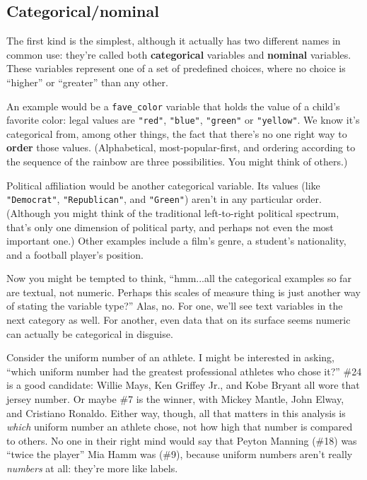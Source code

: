\subsection{Categorical/nominal}

The first kind is the simplest, although it actually has two different names in
common use: they're called both \textbf{categorical} variables and
\textbf{nominal} variables. These variables represent one of a set of
predefined choices, where no choice is ``higher'' or ``greater'' than any
other.

An example would be a \texttt{fave\_color} variable that holds the value of a
child's favorite color: legal values are \texttt{"red"}, \texttt{"blue"},
\texttt{"green"} or \texttt{"yellow"}. We know it's categorical from, among
other things, the fact that there's no one right way to \textbf{order} those
values. (Alphabetical, most-popular-first, and ordering according to the
sequence of the rainbow are three possibilities. You might think of others.)

Political affiliation would be another categorical variable. Its values (like
\texttt{"Democrat"}, \texttt{"Republican"}, and \texttt{"Green"}) aren't in any
particular order. (Although you might think of the traditional left-to-right
political spectrum, that's only one dimension of political party, and perhaps
not even the most important one.) Other examples include a film's genre, a
student's nationality, and a football player's position.

Now you might be tempted to think, ``hmm...all the categorical examples so far
are textual, not numeric. Perhaps this scales of measure thing is just another
way of stating the variable type?'' Alas, no. For one, we'll see text variables
in the next category as well. For another, even data that on its surface seems
numeric can actually be categorical in disguise.

Consider the uniform number of an athlete. I might be interested in asking,
``which uniform number had the greatest professional athletes who chose it?''
\#24 is a good candidate: Willie Mays, Ken Griffey Jr., and Kobe Bryant all
wore that jersey number. Or maybe \#7 is the winner, with Mickey Mantle, John
Elway, and Cristiano Ronaldo. Either way, though, all that matters in this
analysis is \textit{which} uniform number an athlete chose, not how high that
number is compared to others. No one in their right mind would say that Peyton
Manning (\#18) was ``twice the player'' Mia Hamm was (\#9), because uniform
numbers aren't really \textit{numbers} at all: they're more like labels.

